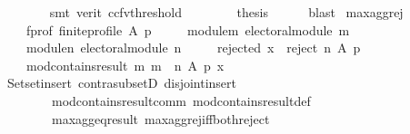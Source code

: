\begin{isabellebody}
\ \ \ \ \ \ \isamarkupfalse%
\ {\isacharparenleft}{\kern0pt}smt\ {\isacharparenleft}{\kern0pt}verit{\isacharcomma}{\kern0pt}\ ccfv{\isacharunderscore}{\kern0pt}threshold{\isacharparenright}{\kern0pt}{\isacharparenright}{\kern0pt}\isanewline
\ \ \isamarkupfalse%
\isanewline
\ \ \isamarkupfalse%
\ \isamarkupfalse%
\ {\isacharquery}{\kern0pt}thesis\isanewline
\ \ \ \ \isamarkupfalse%
\ blast\isanewline
{}\isamarkupfalse%
%
\endisatagproof
{\isafoldproof}%
%
\isadelimproof
\isanewline
%
\endisadelimproof
\isanewline
{}\isamarkupfalse%
\ max{\isacharunderscore}{\kern0pt}agg{\isacharunderscore}{\kern0pt}rej{}{\isacharcolon}{\kern0pt}\isanewline
\ \ \isanewline
\ \ \ \ f{\isacharunderscore}{\kern0pt}prof{\isacharcolon}{\kern0pt}\ {\isachardoublequoteopen}finite{\isacharunderscore}{\kern0pt}profile\ A\ p{\isachardoublequoteclose}\ \isanewline
\ \ \ \ module{\isacharunderscore}{\kern0pt}m{\isacharcolon}{\kern0pt}\ {\isachardoublequoteopen}electoral{\isacharunderscore}{\kern0pt}module\ m{\isachardoublequoteclose}\ \isanewline
\ \ \ \ module{\isacharunderscore}{\kern0pt}n{\isacharcolon}{\kern0pt}\ {\isachardoublequoteopen}electoral{\isacharunderscore}{\kern0pt}module\ n{\isachardoublequoteclose}\ \isanewline
\ \ \ \ rejected{\isacharcolon}{\kern0pt}\ {\isachardoublequoteopen}x\ {\isasymin}\ reject\ n\ A\ p{\isachardoublequoteclose}\isanewline
\ \ \isanewline
\ \ \ \ {\isachardoublequoteopen}mod{\isacharunderscore}{\kern0pt}contains{\isacharunderscore}{\kern0pt}result\ m\ {\isacharparenleft}{\kern0pt}m\ {\isasymparallel}\isactrlsub {\isasymup}\ n{\isacharparenright}{\kern0pt}\ A\ p\ x{\isachardoublequoteclose}\isanewline
%
\isadelimproof
\ \ %
\endisadelimproof
%
\isatagproof
{}\isamarkupfalse%
\ Set{\isachardot}{\kern0pt}set{\isacharunderscore}{\kern0pt}insert\ contra{\isacharunderscore}{\kern0pt}subsetD\ disjoint{\isacharunderscore}{\kern0pt}insert\isanewline
\ \ \ \ \ \ \ \ mod{\isacharunderscore}{\kern0pt}contains{\isacharunderscore}{\kern0pt}result{\isacharunderscore}{\kern0pt}comm\ mod{\isacharunderscore}{\kern0pt}contains{\isacharunderscore}{\kern0pt}result{\isacharunderscore}{\kern0pt}def\isanewline
\ \ \ \ \ \ \ \ max{\isacharunderscore}{\kern0pt}agg{\isacharunderscore}{\kern0pt}eq{\isacharunderscore}{\kern0pt}result\ max{\isacharunderscore}{\kern0pt}agg{\isacharunderscore}{\kern0pt}rej{\isacharunderscore}{\kern0pt}iff{\isacharunderscore}{\kern0pt}both{\isacharunderscore}{\kern0pt}reject\isanewline

\end{isabellebody}
